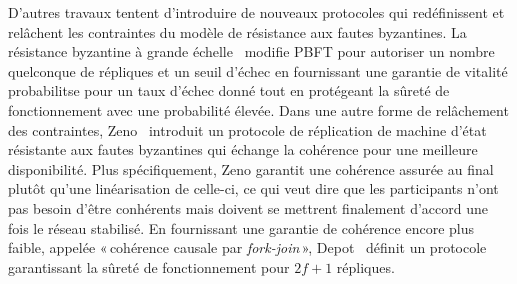 {%

D'autres travaux tentent d'introduire de nouveaux protocoles qui redéfinissent et relâchent les contraintes du modèle
de résistance aux fautes byzantines. La résistance byzantine à grande échelle~\cite{rodrigues2007large} modifie
PBFT pour autoriser un nombre quelconque de répliques et un seuil d'échec en
fournissant une garantie de vi\-talité probabilitse pour un taux d'échec donné tout en protégeant la sûreté de
fonctionnement avec une probabilité élevée. Dans une autre forme de relâchement des contraintes,
Zeno~\cite{singh2009zeno} introduit un protocole de réplication de machine d'état résistante aux fautes byzantines qui
échange la cohérence pour une meilleure disponibilité. Plus spécifiquement, Zeno garantit une cohérence assurée au final
plutôt qu'une linéarisation de celle-ci, ce qui veut dire que les participants n'ont pas besoin d'être conhérents mais
doivent se mettrent finalement d'accord une fois le réseau stabilisé. En fournissant une garantie de cohérence encore
plus faible, appelée «\,cohérence causale par \emph{fork-join}\,», Depot~\cite{mahajan2011depot} définit un protocole
garantissant la sûreté de fonctionnement pour $2f+1$ répliques.

}
